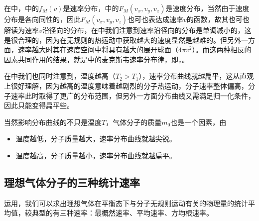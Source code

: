 在中，中的$f_M(v)$是速率分布，中的$F_M(v_x,v_y,v_z)$是速度分布，当然由于速度分布是各向同性的，因此$F_M(v_x,v_y,v_z)$也可也表达成速率$v$的函数，故其也可也解读为速率$v$沿径向的分布，在中我们注意到速率沿径向的分布是单调减小的，这是很合理的，因为在无规则的热运动中获取越大的速度显然是越难的。但另外一方面，速率越大时其在速度空间中将具有越大的展开球面（$4\pi v^2$）。而这两种相反的因素共同作用的结果，就是中的麦克斯韦速率分布律，即，。
\begin{OldFigure}[麦克斯韦分布律]
    \begin{OldFigureSub}[速率分布]
    \end{OldFigureSub}
    \hspace{0.5cm}
    \begin{OldFigureSub}[速度分布]
    \end{OldFigureSub}
\end{OldFigure}

在中我们也同时注意到，温度越高（$T_2>T_1$），速率分布曲线就越扁平，这从直观上很好理解，因为越高的温度意味着越剧烈的分子热运动，分子速率整体偏高，分子速率此时取得了更广的分布范围，但另外一方面分布曲线又需满足归一化条件，因此只能变得扁平些。

当然影响分布曲线的不只是温度$T$，气体分子的质量$m_0$也是一个因素，由\xrefpeq{}
\begin{itemize}
    \item 温度越低，分子质量越大，速率分布曲线就越尖锐。
    \item 温度越高，分子质量越小，速率分布曲线就越扁平。
\end{itemize}

\subsection{理想气体分子的三种统计速率}
\label{subsec:理想气体分子的三种统计速率}
运用，我们可以求出理想气体在平衡态下与分子无规则运动有关的物理量的统计平均值，较典型的有三种速率：最概然速率、平均速率、方均根速率。

